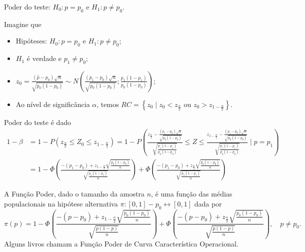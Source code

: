 \documentclass[8pt]{beamer}
\begin{document}
\begin{frame}{Poder do teste: $H_0: p = p_0$ e $H_1: p \neq p_0$.}

\scriptsize

Imagine que 
\begin{itemize}
	\item Hipóteses: $H_0:p=p_0$ e $H_1: p \neq p_0$;
	\item $H_1$ é verdade e $p_1 \neq p_0$;
	\item $z_0 = \frac{(\hat{p}-p_0)\sqrt{n}}{\sqrt{p_0 (1-p_0)}} \sim N \left( \frac{(p_1 - p_0)\sqrt{n}}{\sqrt{p_0(1-p_0)}}; \frac{p_1(1-p_1)}{p_0(1-p_0)} \right)$;
	\item Ao nível de significância $\alpha$, temos $RC = \left\{ z_0 \mid z_0 < z_\frac{\alpha}{2} \mbox{ ou } z_0 > z_{1-\frac{\alpha}{2}}  \right\}$.
\end{itemize}

Poder do teste é dado
\begin{align*}
	1-\beta &= 1 - P\left( z_\frac{\alpha}{2} \leq Z_0 \leq  z_{1-\frac{\alpha}{2}} \right) = 1 - P \left( 
	\frac{ z_\frac{\alpha}{2} - \frac{(p_1 - p_0)\sqrt{n}}{\sqrt{p_0(1-p_0)}}  }{ \sqrt{\frac{ p_1(1 - p_1) }{ p_0(1 - p_0) }} } \leq Z \leq  \frac{ z_{1-\frac{\alpha}{2}} - \frac{(p_1 - p_0)\sqrt{n}}{\sqrt{p_0(1-p_0)}}  }{ \sqrt{\frac{ p_1(1 - p_1) }{ p_0(1 - p_0) }} }
	 \mid p = p_1 \right) \\
	&= 1 - \Phi\left( \frac{ -(p_1 - p_0) + z_{1-\frac{\alpha}{2}}\sqrt{\frac{p_0(1-p_0)}{n}} }{ \sqrt{\frac{p_1(1-p_1)}{n}} } \right) + \Phi\left( \frac{ -(p_1 - p_0) + z_\frac{\alpha}{2}\sqrt{\frac{p_0(1-p_0)}{n}} }{ \sqrt{\frac{p_1(1-p_1)}{n}} } \right) 
\end{align*}

A \textcolor{important}{Função Poder}, dado o tamanho da amostra $n$, é uma função das médias populacionais na hipótese alternativa $\pi: [0,1]-{p_0} \longleftrightarrow [0,1] $ dada por
$$\pi(p) = 1 - \Phi\left( \frac{ -(p - p_0) + z_{1-\frac{\alpha}{2}}\sqrt{\frac{p_0(1-p_0)}{n}} }{ \sqrt{\frac{p(1-p)}{n}} } \right) + \Phi\left( \frac{ -(p - p_0) + z_\frac{\alpha}{2}\sqrt{\frac{p_0(1-p_0)}{n}} }{ \sqrt{\frac{p(1-p)}{n}} } \right), \quad p \neq p_0.$$
Alguns livros chamam a Função Poder de \textcolor{important}{Curva Característica Operacional}.

\normalsize

\end{frame}
\end{document}
